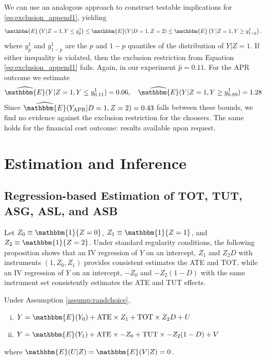 \begin{appendix}
We can use an analogous approach to construct testable implications for \ref{eq:exclusion_append1}, yielding 
\begin{equation}
\mathbbm{E}\left(Y|Z=1,Y\leq y^1_{p}\right) \leq \mathbbm{E}(Y|D=1,Z=2) \leq \mathbbm{E}\left(Y|Z=1,Y \geq y^1_{1-p}\right).
\label{eq:testable1}
\end{equation}
where $y^1_p$ and $y^1_{1-p}$ are the $p$ and $1 - p$ quantiles of the distribution of $Y|Z=1$.
If either inequality is violated, then the exclusion restriction from Equation \ref{eq:exclusion_append1} fails.
Again, in our experiment $\widehat{p}=0.11$. For the APR outcome we estimate
\[
\widehat{\mathbbm{E}}(Y|Z=1,Y\leq y^1_{0.11}) = 0.06, \quad
\widehat{\mathbbm{E}}(Y|Z=1,Y\geq y^1_{0.89}) = 1.28
\]
Since $\widehat{\mathbbm{E}}(Y_\text{APR}|D=1,Z=2) = 0.43$ falls between these bounds, we find no evidence against the exclusion restriction for the choosers. 
The same holds for the financial cost outcome: results available upon request.



\clearpage
\newpage
\section{Estimation and Inference} 
\label{sec:estimation_inference}

\subsection{Regression-based Estimation of TOT, TUT, ASG, ASL, and ASB}

Let $Z_0 \equiv \mathbbm{1}\{Z=0\}$, $Z_1 \equiv \mathbbm{1}\{Z=1\}$, and $Z_2 \equiv \mathbbm{1}\{Z=2\}$.
Under standard regularity conditions, the following proposition shows that an IV regression of $Y$ on an intercept, $Z_1$ and $Z_2 D$ with instruments $(1, Z_0, Z_1)$ provides consistent estimates the ATE and TOT, while an IV regression of $Y$ on an intercept, $-Z_0$ and $-Z_2(1-D)$ with the same instrument set consistently estimates the ATE and TUT effects.

\begin{prop} 
\label{prop:TOTandTUTregs}
Under Assumption \ref{assump:randchoice}, 
\begin{enumerate}[(i)] 
\item $Y = \mathbbm{E}(Y_0) + \text{ATE}\times Z_1 + \text{TOT} \times Z_2 D + U$
\item $Y = \mathbbm{E}(Y_1) + \text{ATE}\times -Z_0 + \text{TUT} \times -Z_2 (1 - D) + V$
\end{enumerate}
where $\mathbbm{E}(U|Z) = \mathbbm{E}(V|Z) = 0$.
\end{prop}


\end{appendix}
